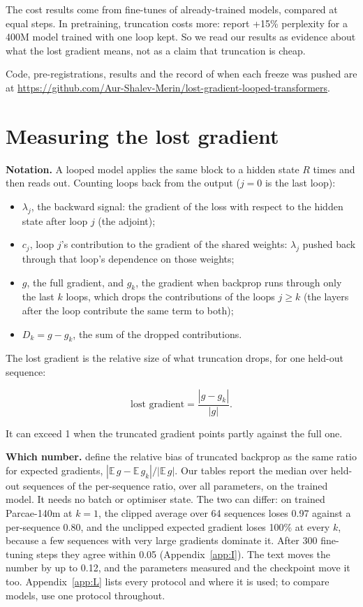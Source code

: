 \documentclass[10pt]{article}
\begin{document}
The cost results come from fine-tunes of already-trained models, compared at equal steps. In pretraining, truncation costs more: \citet{huang2026partii} report +15\% perplexity for a 400M model trained with one loop kept. So we read our results as evidence about what the lost gradient means, not as a claim that truncation is cheap.

Code, pre-registrations, results and the record of when each freeze was pushed are at \url{https://github.com/Aur-Shalev-Merin/lost-gradient-looped-transformers}.

\section{Measuring the lost gradient}\label{sec:2}

\textbf{Notation.} A looped model applies the same block to a hidden state $R$ times and then reads out. Counting loops back from the output ($j = 0$ is the last loop):

\begin{itemize}
\item $\lambda_j$, the backward signal: the gradient of the loss with respect to the hidden state after loop $j$ (the adjoint);
\item $c_j$, loop $j$'s contribution to the gradient of the shared weights: $\lambda_j$ pushed back through that loop's dependence on those weights;
\item $g$, the full gradient, and $g_k$, the gradient when backprop runs through only the last $k$ loops, which drops the contributions of the loops $j \geq k$ (the layers after the loop contribute the same term to both);
\item $D_k = g - g_k$, the sum of the dropped contributions.
\end{itemize}

The lost gradient is the relative size of what truncation drops, for one held-out sequence:

\begin{equation*}\text{lost gradient}=\frac{|g-g_k|}{|g|}.\end{equation*}

It can exceed 1 when the truncated gradient points partly against the full one.

\textbf{Which number.} \citet{aicher2019} define the relative bias of truncated backprop as the same ratio for expected gradients, $|\mathbb{E}\,g - \mathbb{E}\,g_k| / |\mathbb{E}\,g|$. Our tables report the median over held-out sequences of the per-sequence ratio, over all parameters, on the trained model. It needs no batch or optimiser state. The two can differ: on trained Parcae-140m at $k = 1$, the clipped average over 64 sequences loses 0.97 against a per-sequence 0.80, and the unclipped expected gradient loses 100\% at every $k$, because a few sequences with very large gradients dominate it. After 300 fine-tuning steps they agree within 0.05 (Appendix~\ref{app:I}). The text moves the number by up to 0.12, and the parameters measured and the checkpoint move it too. Appendix~\ref{app:L} lists every protocol and where it is used; to compare models, use one protocol throughout.
\end{document}
